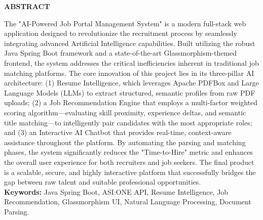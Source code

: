 \documentclass[12pt]{report}
\begin{document}
\newpage 
\begin{center} 
\vspace{1cm} 
\Huge{\textbf{ABSTRACT}}\\[0.8cm] 
\end{center} 
\begin{center} 
\end{center} 
\linespread{1.3}\selectfont
\Large{
The "AI-Powered Job Portal Management System" is a modern full-stack web application designed to revolutionize the recruitment process by seamlessly integrating advanced Artificial Intelligence capabilities. Built utilizing the robust Java Spring Boot framework and a state-of-the-art Glassmorphism-themed frontend, the system addresses the critical inefficiencies inherent in traditional job matching platforms. The core innovation of this project lies in its three-pillar AI architecture: (1) Resume Intelligence, which leverages Apache PDFBox and Large Language Models (LLMs) to extract structured, semantic profiles from raw PDF uploads; (2) a Job Recommendation Engine that employs a multi-factor weighted scoring algorithm—evaluating skill proximity, experience deltas, and semantic title matching—to intelligently pair candidates with the most appropriate roles; and (3) an Interactive AI Chatbot that provides real-time, context-aware assistance throughout the platform. By automating the parsing and matching phases, the system significantly reduces the "Time-to-Hire" metric and enhances the overall user experience for both recruiters and job seekers. The final product is a scalable, secure, and highly interactive platform that successfully bridges the gap between raw talent and suitable professional opportunities.
}\\[1cm]

\noindent \textbf{Keywords:} Java Spring Boot, ASI:ONE API, Resume Intelligence, Job Recommendation, Glassmorphism UI, Natural Language Processing, Document Parsing.
  
\newpage 
\renewcommand*\listfigurename{LIST OF FIGURES} 
\listoffigures 

\newpage 
\renewcommand{\listtablename}{LIST OF TABLES} 
\listoftables 
 
\newpage 
{} 
  
\end{document}

